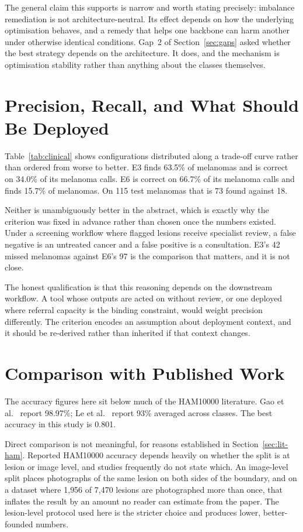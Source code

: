 The general claim this supports is narrow and worth stating precisely: imbalance
remediation is not architecture-neutral. Its effect depends on how the underlying
optimisation behaves, and a remedy that helps one backbone can harm another under
otherwise identical conditions. Gap~2 of Section~\ref{sec:gaps} asked whether the best
strategy depends on the architecture. It does, and the mechanism is optimisation
stability rather than anything about the classes themselves.

\section{Precision, Recall, and What Should Be Deployed}
\label{sec:disc-tradeoff}

Table~\ref{tab:clinical} shows configurations distributed along a trade-off curve rather
than ordered from worse to better. E3 finds 63.5\% of melanomas and is correct on 34.0\%
of its melanoma calls. E6 is correct on 66.7\% of its melanoma calls and finds 15.7\% of
melanomas. On 115 test melanomas that is 73 found against 18.

Neither is unambiguously better in the abstract, which is exactly why the criterion was
fixed in advance rather than chosen once the numbers existed. Under a screening workflow
where flagged lesions receive specialist review, a false negative is an untreated cancer
and a false positive is a consultation. E3's 42 missed melanomas against E6's 97 is the
comparison that matters, and it is not close.

The honest qualification is that this reasoning depends on the downstream workflow. A
tool whose outputs are acted on without review, or one deployed where referral capacity
is the binding constraint, would weight precision differently. The criterion encodes an
assumption about deployment context, and it should be re-derived rather than inherited if
that context changes.

\section{Comparison with Published Work}
\label{sec:disc-comparison}

The accuracy figures here sit below much of the HAM10000 literature. Gao et
al.~\cite{gao2024skinlitenet} report 98.97\%; Le et al.~\cite{le2020classweightedfocal}
report 93\% averaged across classes. The best accuracy in this study is 0.801.

Direct comparison is not meaningful, for reasons established in
Section~\ref{sec:lit-ham}. Reported HAM10000 accuracy depends heavily on whether the
split is at lesion or image level, and studies frequently do not state which. An
image-level split places photographs of the same lesion on both sides of the boundary,
and on a dataset where 1{,}956 of 7{,}470 lesions are photographed more than once, that
inflates the result by an amount no reader can estimate from the paper. The lesion-level
protocol used here is the stricter choice and produces lower, better-founded numbers.

